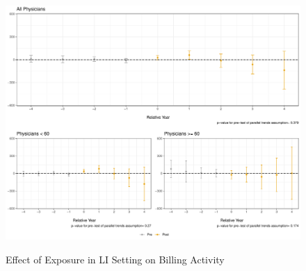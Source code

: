 \documentclass[11pt]{article}
\begin{document}
\begin{figure}[p]
    \centering
    \caption{Effect of Exposure in LI Setting on Billing Activity}
    \includegraphics[scale=.4]{Objects/claim_plot_LI.pdf}
    \label{fig:claim_LI}
\end{figure}
\end{document}
